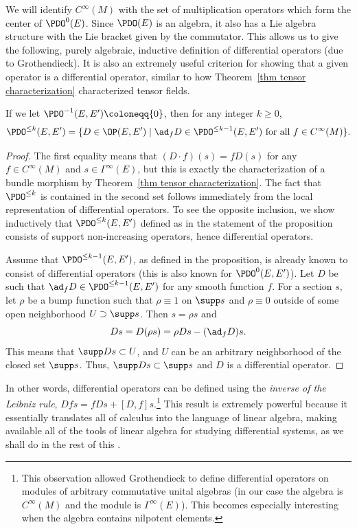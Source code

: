 We will identify $C^\infty(M)$ with the set of multiplication operators which form the center of $\PDO^0(E)$. Since $\PDO(E)$ is an algebra, it also has a Lie algebra structure with the Lie bracket given by the commutator.
This allows us to give the following, purely algebraic, inductive definition of differential operators (due to Grothendieck). It is also an extremely useful criterion for showing that a given operator is a differential operator, similar to how Theorem~\ref{thm tensor characterization} characterized tensor fields.

\begin{prop}
    If we let $\PDO^{-1}(E,E')\coloneqq \{0\}$, then for any integer $k\geq 0$,
    \[\PDO^{\leq k}(E,E')=\{D\in\OP(E,E')\mid \ad_f D\in\PDO^{\leq k-1}(E,E')\text{ for all }f\in C^\infty(M)\}.\]
\end{prop}
\begin{proof}
    The first equality means that $(D\cdot f)(s)=f D(s)$ for any $f\in C^\infty(M)$ and $s\in\Gamma^\infty(E)$, but this is exactly the characterization of a bundle morphism by Theorem~\ref{thm tensor characterization}. The fact that $\PDO^{\leq k}$ is contained in the second set follows immediately from the local representation of differential operators. To see the opposite inclusion, we show inductively that $\PDO^{\leq k}(E,E')$ defined as in the statement of the proposition consists of support non-increasing operators, hence differential operators.

    Assume that $\PDO^{\leq k-1}(E,E')$, as defined in the proposition, is already known to consist of differential operators (this is also known for $\PDO^0(E,E')$). Let $D$ be such that $\ad_fD\in\PDO^{\leq k-1}(E,E')$ for any smooth function $f$. For a section $s$, let $\rho$ be a bump function such that $\rho\equiv 1$ on $\supp s$ and $\rho\equiv 0$ outside of some open neighborhood $U\supset \supp s$. Then $s=\rho s$ and 
    \[Ds=D(\rho s)=\rho Ds-(\ad_f D)s.\]
    This means that $\supp Ds\subset U$, and $U$ can be an arbitrary neighborhood of the closed set $\supp s$. Thus, $\supp Ds\subset \supp s$ and $D$ is a differential operator.
\end{proof}

In other words, differential operators can be defined using the \emph{inverse of the Leibniz rule}, $Dfs=fDs+[D,f]s$.\footnote{This observation allowed Grothendieck to define differential operators on modules of arbitrary commutative unital algebras (in our case the algebra is $C^\infty(M)$ and the module is $\Gamma^\infty(E)$). This becomes especially interesting when the algebra contains nilpotent elements.} This result is extremely powerful because it essentially translates all of calculus into the language of linear algebra, making available all of the tools of linear algebra for studying differential systems, as we shall do in the rest of this \chap.

